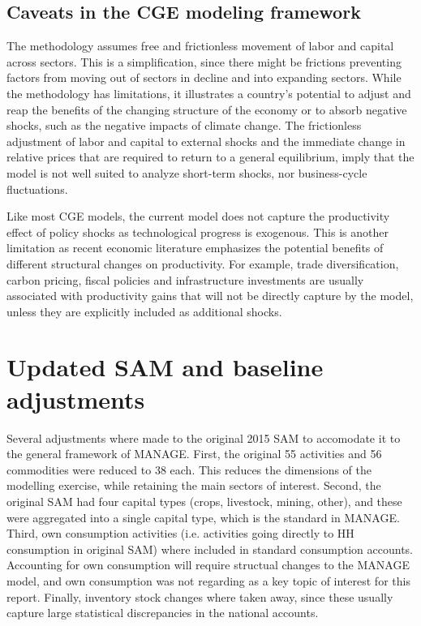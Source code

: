 \documentclass[11pt,english]{article}
\begin{document}
\subsection{Caveats in the CGE modeling framework}

The methodology assumes free and frictionless movement of labor and capital across sectors. This is a simplification, since there might be frictions preventing factors from moving out of sectors in decline and into expanding sectors. While the methodology has limitations, it illustrates a country's potential to adjust and reap the benefits of the changing structure of the economy or to absorb negative shocks, such as the negative impacts of climate change. The frictionless adjustment of labor and capital to external shocks and the immediate change in relative prices that are required to return to a general equilibrium, imply that the model is not well suited to analyze short-term shocks, nor business-cycle fluctuations.

Like most CGE models, the current model does not capture the productivity effect of policy shocks as technological progress is exogenous. This is another limitation as recent economic literature emphasizes the potential benefits of different structural changes on productivity. For example, trade diversification, carbon pricing, fiscal policies and infrastructure investments are usually associated with productivity gains that will not be directly capture by the model, unless they are explicitly included as additional shocks.


\section{Updated SAM and baseline adjustments}

Several adjustments where made to the original 2015 SAM to accomodate it to the general framework of MANAGE. First, the original 55 activities and 56 commodities were reduced to 38 each. This reduces the dimensions of the modelling exercise, while retaining the main sectors of interest.  Second, the original SAM had four capital types (crops, livestock, mining, other), and these were aggregated into a single capital type, which is the standard in MANAGE. Third, own consumption activities (i.e. activities going directly to HH consumption in original SAM) where included in standard consumption accounts. Accounting for own consumption will require structual changes to the MANAGE model, and own consumption was not regarding as a key topic of interest for this report. Finally, inventory stock changes where taken away, since these usually capture large statistical discrepancies in the national accounts. 
\end{document}
